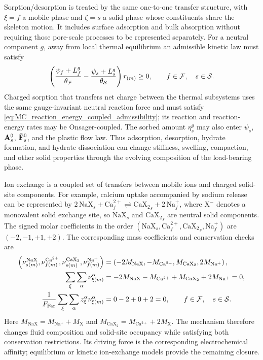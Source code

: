Sorption/desorption is treated by the same one-to-one transfer structure, with
\(\xi=f\) a mobile phase and \(\zeta=s\) a solid phase whose constituents share
the skeleton motion.  It includes surface adsorption and bulk absorption
without requiring those pore-scale processes to be represented separately.
For a neutral component \(g\), away from local thermal equilibrium an
admissible kinetic law must satisfy
%
\begin{equation}
	\left(
	\frac{
	\psi_f+L_f^g
	}{\theta_{\mathcal{F}}}
	-
	\frac{
	\psi_s+L_s^g
	}{\theta_{\mathcal{S}}}
	\right)r_{(m)}
	\ge0,
	\qquad
	f\in\mathcal{F},\quad s\in\mathcal{S} .
	\label{eq:MC_sorption_temperature_weighted_dissipation}
\end{equation}
%
Charged sorption that transfers net charge between the thermal subsystems uses
the same gauge-invariant neutral reaction force and must satisfy
\eqref{eq:MC_reaction_energy_coupled_admissibility}; its reaction and
reaction-energy rates may be Onsager-coupled.
The sorbed amount \(\eta_s^g\) may also enter \(\psi_s\), \(\mathbf{A}_s^0\),
\(\bar{\mathbf{F}}_s^0\), and the plastic flow law.  Thus adsorption, desorption,
hydrate formation, and hydrate dissociation can change stiffness, swelling,
compaction, and other solid properties through the evolving composition of the
load-bearing phase.

\pagebreak[3]
Ion exchange is a coupled set of transfers between mobile ions and charged
solid-site components.  For example, calcium uptake accompanied by sodium
release can be represented by
\(2\,\mathrm{NaX}_s+\mathrm{Ca}^{2+}_f
\rightleftharpoons\mathrm{CaX_2}_s+2\,\mathrm{Na}^{+}_f\), where
\(\mathrm{X^-}\) denotes a monovalent solid exchange site, so
\(\mathrm{NaX}_s\) and \(\mathrm{CaX_2}_s\) are neutral solid components.  The
signed molar coefficients in the order
\((\mathrm{NaX}_s,\mathrm{Ca}^{2+}_f,
\mathrm{CaX_2}_s,\mathrm{Na}^{+}_f)\) are
\((-2,-1,+1,+2)\).  The corresponding mass coefficients and conservation
checks are
%
\begin{align}
	\left(
	\nu_{s (m)}^{\mathrm{NaX}},
	\nu_{f (m)}^{\mathrm{Ca^{2+}}},
	\nu_{s (m)}^{\mathrm{CaX_2}},
	\nu_{f (m)}^{\mathrm{Na^+}}
	\right)
	&=
	\left(
	-2M_{\mathrm{NaX}},
	-M_{\mathrm{Ca^{2+}}},
	M_{\mathrm{CaX_2}},
	2M_{\mathrm{Na^+}}
	\right),
	\notag \\
	\sum_\xi\sum_\alpha\nu_{\xi (m)}^\alpha
	&=
	-2M_{\mathrm{NaX}}
	-M_{\mathrm{Ca^{2+}}}
	+
	M_{\mathrm{CaX_2}}
	+
	2M_{\mathrm{Na^+}}
	=0,
	\notag \\
	\frac{1}{F_{\rm Far}}
	\sum_\xi\sum_\alpha
	z_\xi^\alpha\nu_{\xi (m)}^\alpha
	&=
	0-2+0+2
	=0,
	\qquad
	f\in\mathcal{F},\quad s\in\mathcal{S} .
	\label{eq:MC_ion_exchange_mass_charge_checks}
\end{align}
%
Here \(M_{\mathrm{NaX}}=M_{\mathrm{Na^+}}+M_{\mathrm X}\) and
\(M_{\mathrm{CaX_2}}=M_{\mathrm{Ca^{2+}}}+2M_{\mathrm X}\).  The mechanism
therefore changes fluid composition and solid-site occupancy while satisfying
both conservation restrictions.  Its driving force is the corresponding
electrochemical affinity; equilibrium or kinetic ion-exchange models provide
the remaining closure.


